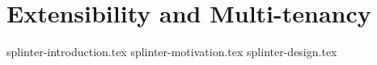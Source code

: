 \chapter{Extensibility and Multi-tenancy}

 {splinter-introduction.tex}
 {splinter-motivation.tex}
 {splinter-design.tex}
